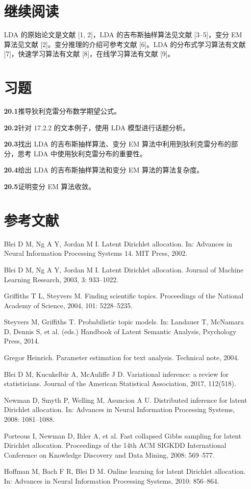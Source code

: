 \documentclass[UTF8,12pt,a4paper,fontset=fandol]{ctexart}
\begin{document}
\section*{继续阅读}

LDA 的原始论文是文献 [1, 2]，LDA 的吉布斯抽样算法见文献 [3--5]，变分 EM 算法见文献 [2]。变分推理的介绍可参考文献 [6]。LDA 的分布式学习算法有文献 [7]，快速学习算法有文献 [8]，在线学习算法有文献 [9]。

\section*{习题}

\noindent\textbf{20.1}\quad 推导狄利克雷分布数学期望公式。

\noindent\textbf{20.2}\quad 针对 17.2.2 的文本例子，使用 LDA 模型进行话题分析。

\noindent\textbf{20.3}\quad 找出 LDA 的吉布斯抽样算法、变分 EM 算法中利用到狄利克雷分布的部分，思考 LDA 中使用狄利克雷分布的重要性。

\noindent\textbf{20.4}\quad 给出 LDA 的吉布斯抽样算法和变分 EM 算法的算法复杂度。

\noindent\textbf{20.5}\quad 证明变分 EM 算法收敛。

\section*{参考文献}

\noindent [1]\quad Blei D M, Ng A Y, Jordan M I. Latent Dirichlet allocation. In: Advances in Neural Information Processing Systems 14. MIT Press, 2002.

\noindent [2]\quad Blei D M, Ng A Y, Jordan M I. Latent Dirichlet allocation. Journal of Machine Learning Research, 2003, 3: 933--1022.

\noindent [3]\quad Griffiths T L, Steyvers M. Finding scientific topics. Proceedings of the National Academy of Science, 2004, 101: 5228--5235.

\noindent [4]\quad Steyvers M, Griffiths T. Probabilistic topic models. In: Landauer T, McNamara D, Dennis S, et al. (eds.) Handbook of Latent Semantic Analysis, Psychology Press, 2014.

\noindent [5]\quad Gregor Heinrich. Parameter estimation for text analysis. Technical note, 2004.

\noindent [6]\quad Blei D M, Kucukelbir A, McAuliffe J D. Variational inference: a review for statisticians. Journal of the American Statistical Association, 2017, 112(518).

\noindent [7]\quad Newman D, Smyth P, Welling M, Asuncion A U. Distributed inference for latent Dirichlet allocation. In: Advances in Neural Information Processing Systems, 2008: 1081--1088.

\noindent [8]\quad Porteous I, Newman D, Ihler A, et al. Fast collapsed Gibbs sampling for latent Dirichlet allocation. Proceedings of the 14th ACM SIGKDD International Conference on Knowledge Discovery and Data Mining, 2008: 569--577.

\noindent [9]\quad Hoffman M, Bach F R, Blei D M. Online learning for latent Dirichlet allocation. In: Advances in Neural Information Processing Systems, 2010: 856--864.
\end{document}
